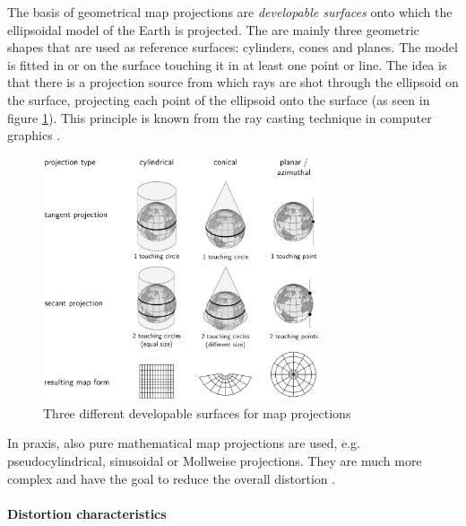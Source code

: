 The basis of geometrical map projections are \emph{developable surfaces} onto which the ellipsoidal model of the Earth is projected. The are mainly three geometric shapes that are used as reference surfaces: cylinders, cones and planes. The model is fitted in or on the surface touching it in at least one point or line. The idea is that there is a projection source from which rays are shot through the ellipsoid on the surface, projecting each point of the ellipsoid onto the surface (as seen in figure \ref{fig:projections}). This principle is known from the ray casting technique in computer graphics
\cite{mapProjectionGeokov}.

\begin{figure}[ht]
  \centering
  \includegraphics[width=0.73\textwidth]{graphics/basics/projections}
  \caption{Three different developable surfaces for map projections \protect\footnotemark}
  \label{fig:projections}
\end{figure}


In praxis, also pure mathematical map projections are used, e.g. pseudocylindrical, sinusoidal or Mollweise projections. They are much more complex and have the goal to reduce the overall distortion
\cite[p.99]{bolstad2008gis}.



\paragraph{Distortion characteristics} %
\label{par:distortion_characteristics}

